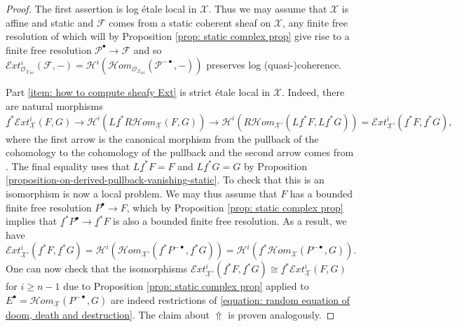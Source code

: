 \documentclass[11pt]{amsart}
\theoremstyle{definition}
\theoremstyle{definition}
\newcommand{\LogO}[1]{\mathcal{O}_{{#1}_\text{l\'et}}}
\begin{document}
\begin{proof}
    The first assertion is log \'etale local in $\mathcal{X}$. Thus we may assume that $\mathcal{X}$ is affine and static and $\mathcal{F}$ comes from a static coherent sheaf on $\mathcal{X}$, any finite free resolution of which will by Proposition \ref{prop: static complex prop} give rise to a finite free resolution $\mathcal{P}^\bullet\rightarrow\mathcal{F}$ and so $\mathcal{E}xt^{i}_{\LogO{\mathcal{X}}}(\mathcal{F},-) = \mathcal{H}^{i}(\mathcal{H}om_{\LogO{\mathcal{X}}}(\mathcal{P}^{-\bullet},-))$ preserves log (quasi-)coherence.
    
    Part \eqref{item: how to compute sheafy Ext} is strict \'etale local in $\mathcal{X}$. Indeed, there are natural morphisms 
    \begin{equation}\label{equation: random equation of doom, death and destruction}
        \underline{f}^*\mathcal{E}xt^{i}_{\underline{\mathcal{X}}}(F,G)\longrightarrow \mathcal{H}^{i}(L\underline{f}^*R\mathcal{H}om_{\underline{\mathcal{X}}}(F,G))\longrightarrow \mathcal{H}^{i}(R\mathcal{H}om_{\underline{\mathcal{X}}'}(L\underline{f}^*F,L\underline{f}^*G)) =  \mathcal{E}xt^{i}_{\underline{\mathcal{X}}'}(\underline{f}^*F,\underline{f}^*G),
    \end{equation} 
    where the first arrow is the canonical morphism from the pullback of the cohomology to the cohomology of the pullback and the second arrow comes from \cite[08JF]{stacks}. The final equality uses that $L\underline{f}^*F = F$ and $L\underline{f}^*G = G$ by Proposition \ref{proposition-on-derived-pullback-vanishing-static}. To check that this is an isomorphism is now a local problem. We may thus assume that $F$ has a bounded finite free resolution $P^\bullet \rightarrow F$, which by Proposition \ref{prop: static complex prop} implies that $\underline{f}^*P^\bullet \rightarrow \underline{f}^*F$ is also a bounded finite free resolution. As a result, we have $\mathcal{E}xt^{i}_{\underline{\mathcal{X}}'}(\underline{f}^*F,\underline{f}^*G) = \mathcal{H}^{i}(\mathcal{H}om_{\underline{\mathcal{X}}'}(\underline{f}^*P^{-\bullet},\underline{f}^*G)) = \mathcal{H}^{i}(\underline{f}^*\mathcal{H}om_{\underline{\mathcal{X}}}(P^{-\bullet},G))$. One can now check that the isomorphisms $\mathcal{E}xt^{i}_{\underline{\mathcal{X}}'}(\underline{f}^* F,\underline{f}^* G) \cong \underline{f}^* \mathcal{E}xt^{i}_{\underline{\mathcal{X}}}(F,G)$ for $i\geq n-1$ due to Proposition \ref{prop: static complex prop} applied to $E^\bullet = \mathcal{H}om_{\underline{\mathcal{X}}}(P^{-\bullet},G)$  are indeed restrictions of \eqref{equation: random equation of doom, death and destruction}. The claim about $\Uparrow$ is proven analogously.
\end{proof}
\end{document}
